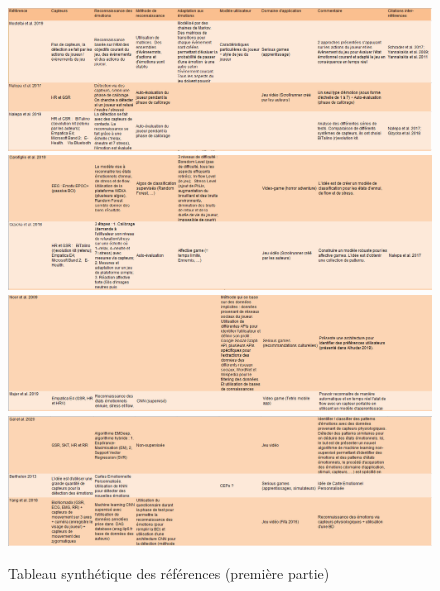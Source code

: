 \documentclass{article}
\begin{document}
		\begin{figure}
			\includegraphics[scale=0.47]{include/tri1.PNG}\\
			\includegraphics[scale=0.47]{include/tri2.PNG}\\
			\includegraphics[scale=0.47]{include/tri3.PNG}\\
			\includegraphics[scale=0.47]{include/tri4.PNG}
			\caption{Tableau synthétique des références (première partie)}
			\label{fig:tabsynt1}
		\end{figure}
\end{document}

